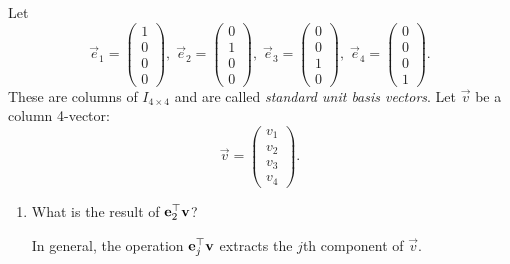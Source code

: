 \documentclass{ximera}
\author{Tae Eun Kim}
\begin{document}
\begin{exercise}
  Let
  \[
    \vec{e}_1 =
    \begin{pmatrix}
      1\\ 0\\ 0\\ 0
    \end{pmatrix},\;
    \vec{e}_2 =
    \begin{pmatrix}
      0\\ 1\\ 0\\ 0
    \end{pmatrix},\;
    \vec{e}_3 =
    \begin{pmatrix}
      0\\ 0\\ 1\\ 0
    \end{pmatrix},\;
    \vec{e}_4 =
    \begin{pmatrix}
      0\\ 0\\ 0\\ 1
    \end{pmatrix}.
  \]
  These are columns of $I_{4 \times 4}$ and are called \textit{standard
    unit basis vectors}.
  Let $\vec{v}$ be a column 4-vector:
  \[
    \vec{v} =
    \begin{pmatrix}
      v_1 \\ v_2 \\ v_3 \\ v_4
    \end{pmatrix}.
  \]

  \begin{enumerate}
  \item What is the result of $\mathbf{e}_2^\top \mathbf{v}$?
    \begin{multipleChoice}
    \end{multipleChoice}
    \begin{feedback}[correct]
      In general, the operation $\mathbf{e}_j^\top \mathbf{v}$ extracts
      the $j$th component of $\vec{v}$.
    \end{feedback}



\end{enumerate}
\end{exercise}
\end{document}
